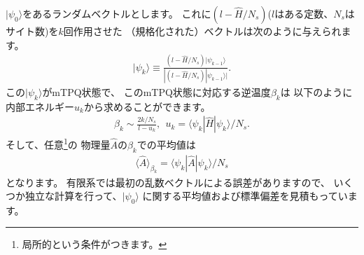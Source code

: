 $|\psi_{0}\rangle$をあるランダムベクトルとします。
これに$(l-\hat{H}/N_{s})$($l$はある定数、$N_{s}$はサイト数)を$k$回作用させた
（規格化された）ベクトルは次のように与えられます。
\begin{align}
|\psi_{k}\rangle \equiv \frac{(l-\hat{H}/N_{s})|\psi_{k-1}\rangle}{|(l-\hat{H}/N_{s})|\psi_{k-1}\rangle|}.
\end{align}
この$|\psi_{k}\rangle$がmTPQ状態で、
このmTPQ状態に対応する逆温度$\beta_{k}$は
以下のように内部エネルギー$u_{k}$から求めることができます。
\begin{align}
\beta_{k}\sim \frac{2k/N_{s}}{l-u_{k}},~~
u_{k} = \langle \psi_{k}|\hat{H}|\psi_{k}\rangle/N_{s}.
\end{align}
そして、任意\footnote{局所的という条件がつきます。}の
物理量$\hat{A}$の$\beta_{k}$での平均値は
\begin{align}
\langle \hat{A}\rangle_{\beta_{k}} =  \langle \psi_{k}|\hat{A}|\psi_{k}\rangle/N_{s}
\end{align}
となります。
有限系では最初の乱数ベクトルによる誤差がありますので、
いくつか独立な計算を行って、$|\psi_{0}\rangle$
に関する平均値および標準偏差を見積もっています。


